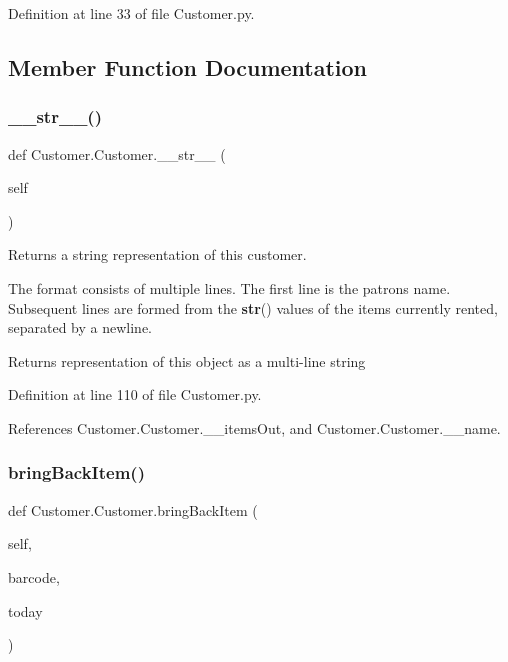 Definition at line 33 of file Customer.\+py.



\subsection{Member Function Documentation}
\mbox{\label{classCustomer_1_1Customer_aa12655d57338586f1ee2a5c101d44356}} 
\subsubsection{\texorpdfstring{\+\_\+\+\_\+str\+\_\+\+\_\+()}{\_\_str\_\_()}}
{\footnotesize\ttfamily def Customer.\+Customer.\+\_\+\+\_\+str\+\_\+\+\_\+ (\begin{DoxyParamCaption}\item[{}]{self }\end{DoxyParamCaption})}



Returns a string representation of this customer. 

The format consists of multiple lines. The first line is the patron\textquotesingle{}s name. Subsequent lines are formed from the {\bfseries str}() values of the items currently rented, separated by a newline. \begin{DoxyReturn}{Returns}
representation of this object as a multi-\/line string 
\end{DoxyReturn}


Definition at line 110 of file Customer.\+py.



References Customer.\+Customer.\+\_\+\+\_\+items\+Out, and Customer.\+Customer.\+\_\+\+\_\+name.

\mbox{\label{classCustomer_1_1Customer_ac589f3f34db4ca44e3071e7260f5f8b6}} 
\subsubsection{\texorpdfstring{bring\+Back\+Item()}{bringBackItem()}}
{\footnotesize\ttfamily def Customer.\+Customer.\+bring\+Back\+Item (\begin{DoxyParamCaption}\item[{}]{self,  }\item[{}]{barcode,  }\item[{}]{today }\end{DoxyParamCaption})}



